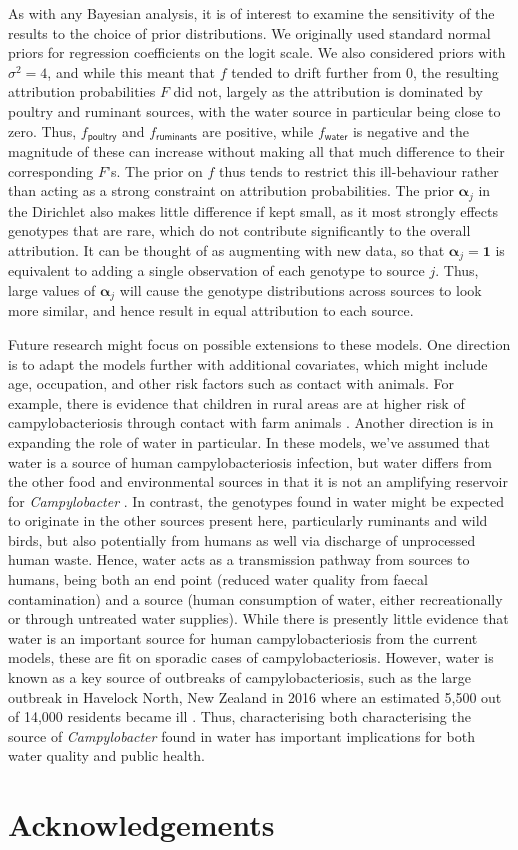 \documentclass[times, doublespace]{simauth}%
\begin{document}
As with any Bayesian analysis, it is of interest to examine the sensitivity of the results to the choice of prior distributions. We originally used standard normal priors for regression coefficients on the logit scale. We also considered priors with $\sigma^2=4$, and while this meant that $f$ tended to drift further from 0, the resulting attribution probabilities $F$ did not, largely as the attribution is dominated by poultry and ruminant sources, with the water source in particular being close to zero. Thus, $f_\mathsf{poultry}$ and $f_\mathsf{ruminants}$ are positive, while $f_\mathsf{water}$ is negative and the magnitude of these can increase without making all that much difference to their corresponding $F$'s. The prior on $f$ thus tends to restrict this ill-behaviour rather than acting as a strong constraint on attribution probabilities. The prior $\mathbf{\alpha}_j$ in the Dirichlet also makes little difference if kept small, as it most strongly effects genotypes that are rare, which do not contribute significantly to the overall attribution. It can be thought of as augmenting with new data, so that $\mathbf{\alpha}_j=\mathbf{1}$ is equivalent to adding a single observation of each genotype to source $j$. Thus, large values of $\mathbf{\alpha}_j$ will cause the genotype distributions across sources to look more similar, and hence result in equal attribution to each source.

Future research might focus on possible extensions to these models. One direction is to adapt the models further with additional covariates, which might include age, occupation, and other risk factors such as contact with animals. For example, there is evidence that children in rural areas are at higher risk of campylobacteriosis through contact with farm animals \cite{MullM, Spencer2012}. Another direction is in expanding the role of water in particular. In these models, we've assumed that water is a source of human campylobacteriosis infection, but water differs from the other food and environmental sources in that it is not an amplifying reservoir for \emph{Campylobacter} \cite{Wagen}. In contrast, the genotypes found in water might be expected to originate in the other sources present here, particularly ruminants and wild birds, but also potentially from humans as well via discharge of unprocessed human waste. Hence, water acts as a transmission pathway from sources to humans, being both an end point (reduced water quality from faecal contamination) and a source (human consumption of water, either recreationally or through untreated water supplies). While there is presently little evidence that water is an important source for human campylobacteriosis from the current models, these are fit on sporadic cases of campylobacteriosis. However, water is known as a key source of outbreaks of campylobacteriosis, such as the large outbreak in Havelock North, New Zealand in 2016 where an estimated 5,500 out of 14,000 residents became ill \cite{dia_campy_report1}. Thus, characterising both characterising the source of \emph{Campylobacter} found in water has important implications for both water quality and public health.

\section*{Acknowledgements}


\end{document}

